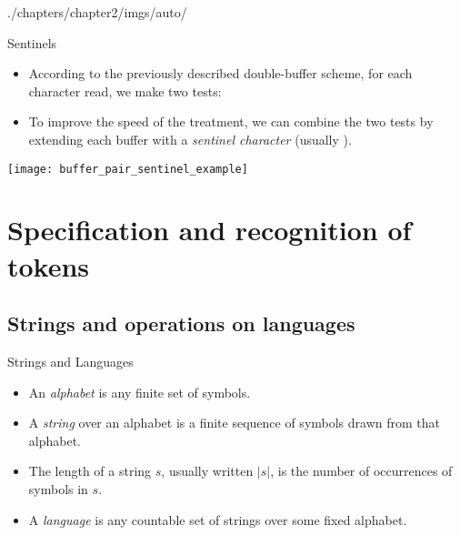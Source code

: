 \begin{graphicspathcontext}{{./chapters/chapter2/imgs/auto/}}
\begin{bibunit}[apalike]
\begin{frame}{Sentinels}
	\begin{itemize}
	\item According to the previously described double-buffer scheme, for each character read, we make two tests: 
	\item To improve the speed of the treatment, we can combine the two tests by extending each buffer with a \emph{sentinel character} (usually ).
	\end{itemize}
	\vfill
	\begin{center}
		\texttt{[image: buffer\_pair\_sentinel\_example]}
	\end{center}
\end{frame}

\section[Token Recognition]{Specification and recognition of tokens}

\tableofcontentslide[sections={1-5},sectionstyle={show/shaded},subsectionstyle={show/show/hide},subsubsectionstyle={hide/hide/hide/hide}]

\subsection{Strings and operations on languages}
\begin{frame}{Strings and Languages}
	\begin{itemize}
	\item An \emph{alphabet} is any finite set of symbols. \\
	\vfill
	\item A \emph{string} over an alphabet is a finite sequence of symbols drawn from that alphabet. \\
	\item The length of a string $s$, usually written $|s|$, is the number of occurrences of symbols in $s$.
	\vfill
	\item A \emph{language} is any countable set of strings over some fixed alphabet. \\
	\end{itemize}
\end{frame}


\end{bibunit}
\end{graphicspathcontext}
